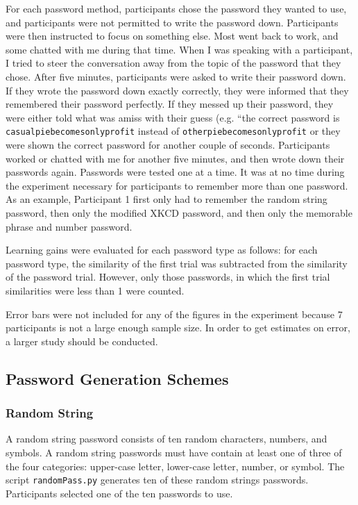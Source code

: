 \documentclass{article}
\begin{document}
For each password method, participants chose the password they wanted to use, and participants were not permitted to write the password down. Participants were then instructed to focus on something else. Most went back to work, and some chatted with me during that time. When I was speaking with a participant, I tried to steer the conversation away from the topic of the password that they chose. After five minutes, participants were asked to write their password down. If they wrote the password down exactly correctly, they were informed that they remembered their password perfectly. If they messed up their password, they were either told what was amiss with their guess (e.g. ``the correct password is \texttt{casualpiebecomesonlyprofit} instead of \texttt{otherpiebecomesonlyprofit} or they were shown the correct password for another couple of seconds. Participants worked or chatted with me for another five minutes, and then wrote down their passwords again. Passwords were tested one at a time. It was at no time during the experiment necessary for participants to remember more than one password. As an example, Participant 1 first only had to remember the random string password, then only the modified XKCD password, and then only the memorable phrase and number password.

Learning gains were evaluated for each password type as follows: for each password type, the similarity of the first trial was subtracted from the similarity of the password trial. However, only those passwords, in which the first trial similarities were less than 1 were counted. 

Error bars were not included for any of the figures in the experiment because 7 participants is not a large enough sample size. In order to get estimates on error, a larger study should be conducted.



\subsection*{Password Generation Schemes}
\subsubsection*{Random String}
A random string password consists of ten random characters, numbers, and symbols. A random string passwords must have contain at least one of three of the four categories: upper-case letter, lower-case letter, number, or symbol. The script \texttt{randomPass.py} generates ten of these random strings passwords. Participants selected one of the ten passwords to use.
\end{document}
